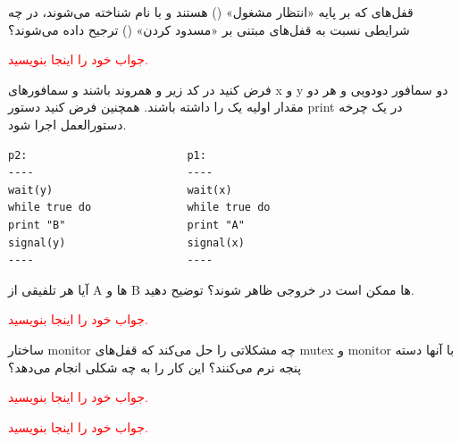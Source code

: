 \documentclass[12pt, answers]{exam}
\begin{document}
\begin{questions}
    \pagebreak
    \question
    قفل‌های  که بر پایه «انتظار مشغول» () هستند و
    با نام  شناخته می‌شوند،
    در چه شرایطی نسبت به قفل‌های مبتنی بر «مسدود کردن» () ترجیح داده می‌شوند؟
    \\
    \begin{solution}
        \textcolor{red}{جواب خود را اینجا بنویسید.}
    \end{solution}

    \question فرض کنید در کد زیر
     و 
    همروند باشند و سمافورهای x و y دو سمافور دودویی و هر دو مقدار اولیه یک را داشته باشند. همچنین
    فرض کنید دستور print در یک چرخه دستورالعمل اجرا شود.

    \begin{latin}
        \begin{center}
            \begin{lstlisting}[basicstyle=\ttfamily\small]
p2:                         p1:
----                        ----
wait(y)                     wait(x)
while true do               while true do
print "B"                   print "A"
signal(y)                   signal(x)
----                        ----
            \end{lstlisting}
        \end{center}
    \end{latin}

    آیا هر تلفیقی از A ها و B ها ممکن است در خروجی ظاهر شوند؟ توضیح دهید.
    \\
    \begin{solution}
        \textcolor{red}{جواب خود را اینجا بنویسید.}
    \end{solution}

    \pagebreak
    \question
    ساختار monitor چه مشکلاتی را حل می‌کند که قفل‌های mutex و monitor با آنها دسته پنجه نرم می‌کنند؟
    این کار را به چه شکلی انجام می‌دهد؟
    \\
    \begin{solution}
        \textcolor{red}{جواب خود را اینجا بنویسید.}
    \end{solution}
    \pagebreak

    \question

    \begin{solution}
        \textcolor{red}{جواب خود را اینجا بنویسید.}
    \end{solution}


\end{questions}
\end{document}
